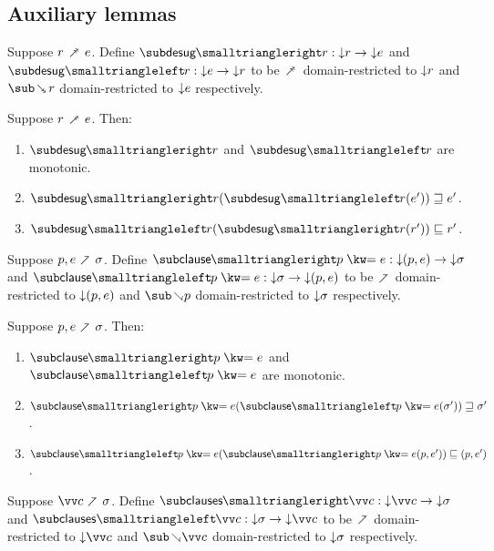 \subsection{Auxiliary lemmas}

\begin{definition}
   Suppose $r \desugarFwdR e$. Define $\desugarListRestFwdF{r}: \Below{r} \to \Below{e}$ and $\desugarListRestBwdF{r}: \Below{e} \to \Below{r}$ to be $\desugarFwdR$ domain-restricted to ${\downarrow}{r}$ and $\desugarBwdR{r}$ domain-restricted to ${\downarrow}{e}$ respectively.
\end{definition}

\begin{lemma}
  \label{lem:aux:desugarlistrest:gc}
  Suppose $r \desugarFwdR e$. Then:
  \begin{enumerate}
     \item $\desugarListRestFwdF{r}$ and $\desugarListRestBwdF{r}$ are monotonic.
     \item $\desugarListRestFwdF{r}(\desugarListRestBwdF{r}(e')) \geq e'$.
     \item $\desugarListRestBwdF{r}(\desugarListRestFwdF{r}(r')) \leq r'$.
  \end{enumerate}
\end{lemma}

\begin{definition}
   Suppose $p, e \clauseFwd \sigma$. Define $\clauseFwdF{\clause{p}{e}}: \Below{(p,e)} \to \Below{\sigma}$ and $\clauseBwdF{\clause{p}{e}}: \Below{\sigma} \to \Below{(p,e)}$ to be $\clauseFwd$ domain-restricted to ${\downarrow}{(p,e)}$ and $\clauseBwd{p}$ domain-restricted to ${\downarrow}{\sigma}$ respectively.
\end{definition}

\begin{lemma}
  \label{lem:aux:clause:gc}
  Suppose $p, e \clauseFwd \sigma$. Then:
  \begin{enumerate}
     \item $\clauseFwdF{\clause{p}{e}}$ and $\clauseBwdF{\clause{p}{e}}$ are monotonic.
     \item $\clauseFwdF{\clause{p}{e}}(\clauseBwdF{\clause{p}{e}}(\sigma')) \geq \sigma'$.
     \item $\clauseBwdF{\clause{p}{e}}(\clauseFwdF{\clause{p}{e}}(p,e')) \leq (p,e')$.
  \end{enumerate}
\end{lemma}

\begin{definition}
   Suppose $\vec{c} \clauseFwd \sigma$. Define $\desugarClausesFwdF{\vec{c}}: \Below{\vec{c}} \to \Below{\sigma}$ and $\desugarClausesBwdF{\vec{c}}: \Below{\sigma} \to \Below{\vec{c}}$ to be $\clauseFwd$ domain-restricted to $\Below{\vec{c}}$ and $\clauseBwd{\vec{c}}$ domain-restricted to ${\downarrow}{\sigma}$ respectively.
\end{definition}

